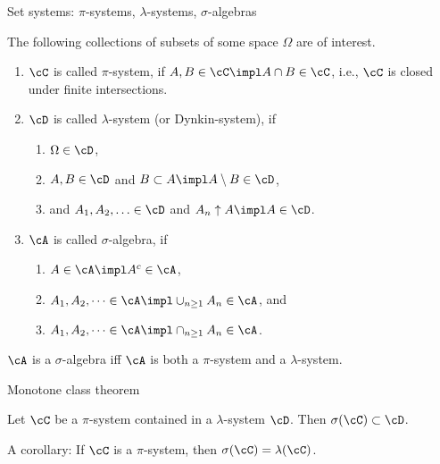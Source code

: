 \begin{frame}
    {Set systems: $\pi$-systems, $\lambda$-systems, $\sigma$-algebras}
    
    The following collections of subsets of some space $\Omega$ are of interest.

    \begin{enumerate}
        \item $\cC$ is called $\pi$-system, if $A,B\in \cC \impl A \cap B \in
            \cC$, i.e., $\cC$ is closed under finite intersections.
        \item $\cD$ is called $\lambda$-system (or Dynkin-system), if 
            \begin{enumerate}
                \item $\Omega\in\cD$,
                \item $A,B\in\cD$ and $B \subset A \impl A \setminus B \in\cD$,
                \item  and $A_1,A_2,\ldots \in\cD$ and $A_n \uparrow A \impl A
                    \in \cD$.
            \end{enumerate}
        \item $\cA$ is called $\sigma$-algebra, if 
            \begin{enumerate}
                \item $A\in\cA \impl A^{c}\in\cA$, 
                \item $A_1,A_2, \cdots \in\cA \impl \cup_{n\geq 1} A_n \in\cA$, and
                \item $A_1,A_2, \cdots \in\cA \impl \cap_{n\geq 1} A_n \in\cA$.
            \end{enumerate}
    \end{enumerate}

    \begin{theorem}
        $\cA$ is a $\sigma$-algebra iff $\cA$ is both a $\pi$-system and a
        $\lambda$-system.
    \end{theorem}
\end{frame}


\begin{frame}
    {Monotone class theorem}
    
    \begin{theorem}
        Let $\cC$ be a $\pi$-system contained in a $\lambda$-system $\cD$. Then
        $\sigma(\cC) \subset \cD$.
    \end{theorem}

    A corollary: If $\cC$ is a $\pi$-system, then $\sigma(\cC)=\lambda(\cC)$. 

\end{frame}


